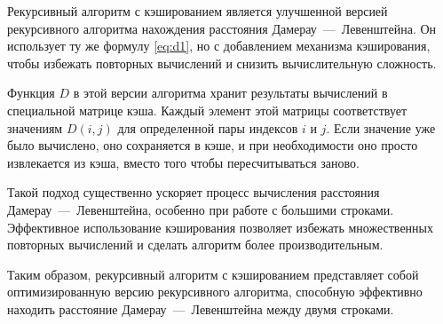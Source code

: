 Рекурсивный алгоритм с кэшированием является улучшенной версией рекурсивного алгоритма нахождения расстояния Дамерау~---~Левенштейна. 
Он использует ту же формулу \ref{eq:d1}, но с добавлением механизма кэширования, чтобы избежать повторных вычислений и снизить вычислительную сложность.

Функция $D$ в этой версии алгоритма хранит результаты вычислений в специальной матрице кэша. 
Каждый элемент этой матрицы соответствует значениям $D(i, j)$ для определенной пары индексов $i$ и $j$. 
Если значение уже было вычислено, оно сохраняется в кэше, и при необходимости оно просто извлекается из кэша, вместо того чтобы пересчитываться заново.

Такой подход существенно ускоряет процесс вычисления расстояния Дамерау~---~Левенштейна, особенно при работе с большими строками.
Эффективное использование кэширования позволяет избежать множественных повторных вычислений и сделать алгоритм более производительным.

Таким образом, рекурсивный алгоритм с кэшированием представляет собой оптимизированную версию рекурсивного алгоритма, способную эффективно находить расстояние Дамерау~---~Левенштейна между двумя строками.

